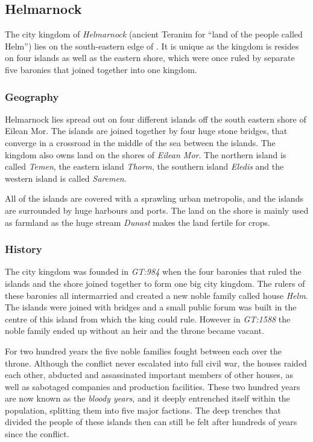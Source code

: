\subsection{Helmarnock}
\label{sec:Helmarnock}

The city kingdom of \emph{Helmarnock} (ancient Teranim for ``land of the
people called Helm'') lies on the south-eastern edge of . It is unique as the kingdom is resides on four islands as well as the
eastern shore, which were once ruled by separate five baronies that joined
together into one kingdom.

\subsubsection{Geography}

Helmarnock lies spread out on four different islands off the south eastern
shore of Eilean Mor. The islands are joined together by four huge stone
bridges, that converge in a crossroad in the middle of the sea between the
islands. The kingdom also owns land on the shores of \emph{Eilean Mor}.  The
northern island is called \emph{Temen}, the eastern island \emph{Thorm}, the
southern island \emph{Eledis} and the western island is called \emph{Saremen}.

All of the islands are covered with a sprawling urban metropolis, and the
islands are surrounded by huge harbours and ports. The land on the shore is
mainly used as farmland as the huge stream \emph{Dunast} makes the land
fertile for crops.

\subsubsection{History}

The city kingdom was founded in \emph{GT:984} when the four baronies that
ruled the islands and the shore joined together to form one big city kingdom.
The rulers of these baronies all intermarried and created a new noble family
called house \emph{Helm}. The islands were joined with bridges and a small
public forum was built in the centre of this island from which the king could
rule. However in \emph{GT:1588} the noble family ended up without an heir and
the throne became vacant.

For two hundred years the five noble families fought between each over the
throne. Although the conflict never escalated into full civil war, the houses
raided each other, abducted and assassinated important members of other
houses, as well as sabotaged companies and production facilities. These two
hundred years are now known as the \emph{bloody years}, and it deeply
entrenched itself within the population, splitting them into five major
factions. The deep trenches that divided the people of these islands then can
still be felt after hundreds of years since the conflict.


